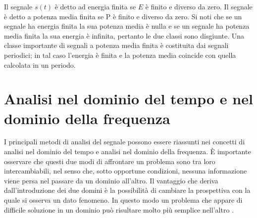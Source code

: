 Il segnale $s(t)$ \`e detto ad energia finita se $E$ \`e finito e diverso da zero. 
Il segnale \`e detto a potenza media finita se P \`e finito e diverso da zero. Si noti che se un segnale ha energia finita la sua potenza media \`e nulla e se un segnale ha potenza media finita la sua energia \`e infinita, pertanto le due classi sono disgiunte. 
Una classe importante di segnali a potenza media finita \`e costituita dai segnali periodici; in tal caso l'energia \`e finita e la potenza media coincide con quella calcolata in un periodo.



\section{Analisi nel dominio del tempo e nel dominio della frequenza}
\begin{comment}
dato un segnale infinito il suo contenuto in frequenza (il suo spettro) si pu\`o ottenere con una operazione matematica detta Integrale di Fourier. Il risultato dell'Integrale di Fourier di s(t) \`e una funzione a valori complessi S(ω) definita tra meno infinito e pi\`u infinito. I valori complessi portano con sé l'informazione relativa alla fase del segnale. 
Per esempio se si considera il segnale emesso da un sistema di altoparlanti multivia, spostando la posizione del tweeter cambia la fase del segnale e non il suo contenuto in frequenza, in altri termini il valore assoluto dell'Integrale di Fourier resta lo stesso. 
L'integrale di Fourier \`e reversibile, nel senso che a partire dal contenuto in frequenza si pu\`o costruire esattamente il segnale originale. 
Ricordo che stiamo parlando di operazioni matematiche svolte su segnali infiniti lavorando con quantit\`a senza errori, in altra parola segni di lapis su di un pezzo di carta ed esattamente va inteso in questo senso. 
Di solito quando si parla di spettro di un segnale si trascura la fase e si considera |S(ω)| (oppure se ci interessa la potenza espressa in decibel la quantit\`a 20 Log10 | S(ω)|). 
In entrambi i casi si pu\`o dimostrare che la parte positiva e la parte negativa delle funzioni risultanti sono specularmente uguali e quindi di solito se ne disegna solo la parte positiva. 
Con questa semplificazione per\`o si perde la reversibilit\`a e quello che resta \`e solo una misura effettuata sul segnale, priva dell'informazione completa. Per comprendere appiano il significato dell'integrale di Fourier sono necessari alcuni preliminari matematici.
\end{comment}
I principali metodi di analisi del segnale possono essere riassunti nei concetti di analisi nel dominio del tempo e analisi nel dominio della frequenza. 
\`E importante osservare che questi due modi di affrontare un problema sono tra loro intercambiabili, nel senso che, sotto opportune condizioni, nessuna informazione viene persa nel passare da un dominio all'altro. 
Il vantaggio che deriva dall'introduzione dei due domini \`e la possibilit\`a di cambiare la prospettiva con la quale si osserva un dato fenomeno. 
In questo modo un problema che appare di difficile soluzione in un dominio pu\`o risultare molto pi\`u semplice nell'altro \cite{DomTF}.

